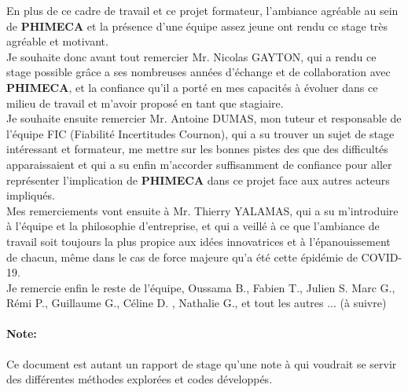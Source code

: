 \documentclass[a4paper,10pt]{article}
\begin{document}
En plus de ce cadre de travail et ce projet formateur, l'ambiance agréable au sein de \textbf{PHIMECA} et la présence d'une équipe assez jeune ont rendu ce stage très agréable et motivant. \\

Je souhaite donc avant tout remercier Mr. Nicolas GAYTON, qui a rendu ce stage possible grâce a ses nombreuses années d'échange et de collaboration avec \textbf{PHIMECA}, et la confiance qu'il a porté en mes capacités à évoluer dans ce milieu de travail et m'avoir proposé en tant que stagiaire.\\

Je souhaite ensuite remercier Mr. Antoine DUMAS, mon tuteur et responsable de l'équipe FIC (Fiabilité Incertitudes Cournon), qui a su trouver un sujet de stage intéressant et formateur, me mettre sur les bonnes pistes
des que des difficultés apparaissaient et qui a su enfin m'accorder suffisamment de confiance pour aller représenter l'implication de \textbf{PHIMECA} dans ce projet face aux autres acteurs impliqués. \\

Mes remerciements vont ensuite à Mr. Thierry YALAMAS, qui a su m'introduire à l'équipe et la philosophie d'entreprise, et qui a veillé à ce que l'ambiance de travail soit toujours la plus propice aux idées innovatrices et à l'épanouissement de chacun, même dans le cas de force majeure qu'a été cette épidémie de COVID-19. \\

Je remercie enfin le reste de l'équipe, Oussama B., Fabien T., Julien S. Marc G., Rémi P., Guillaume G., Céline D. , Nathalie G., et tout les autres ... (à suivre)

\paragraph{Note:}
Ce document est autant un rapport de stage qu'une note à qui voudrait se servir des différentes méthodes explorées et codes développés.

\newpage
\end{document}
